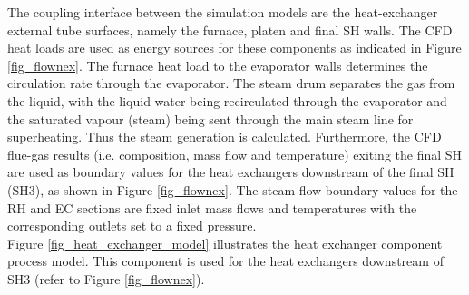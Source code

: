 \documentclass[twocolumn,10pt]{asme2ej}
\begin{document}
The coupling interface between the simulation models are the heat-exchanger external tube surfaces, namely the furnace, platen and final SH walls. The CFD heat loads are used as energy sources for these components as indicated in Figure \ref{fig_flownex}. The furnace heat load to the evaporator walls determines the circulation rate through the evaporator. The steam drum separates the gas from the liquid, with the liquid water being recirculated through the evaporator and the saturated vapour (steam) being sent through the main steam line for superheating. Thus the steam generation is calculated. Furthermore, the CFD flue-gas results (i.e. composition, mass flow and temperature) exiting the final SH are used as boundary values for the heat exchangers downstream of the final SH (SH3), as shown in Figure \ref{fig_flownex}. The steam flow boundary values for the RH and EC sections are fixed inlet mass flows and temperatures with the corresponding outlets set to a fixed pressure.\\

Figure \ref{fig_heat_exchanger_model} illustrates the heat exchanger component process model. This component is used for the heat exchangers downstream of SH3 (refer to Figure \ref{fig_flownex}).\\
\end{document}
